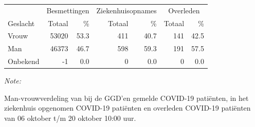 \documentclass[
  english,
  man,floatsintext]{apa6}
\begin{document}
\begin{table}[H]
\centering\begingroup\fontsize{11}{13}\selectfont

\begin{threeparttable}
\begin{tabular}{lrrrrrr}
\toprule
\multicolumn{1}{c}{ } & \multicolumn{2}{c}{Besmettingen} & \multicolumn{2}{c}{Ziekenhuisopnames} & \multicolumn{2}{c}{Overleden} \\
\cmidrule(l{3pt}r{3pt}){2-3} \cmidrule(l{3pt}r{3pt}){4-5} \cmidrule(l{3pt}r{3pt}){6-7}
Geslacht & Totaal & \% & Totaal & \% & Totaal & \%\\
\midrule
Vrouw & 53020 & 53.3 & 411 & 40.7 & 141 & 42.5\\
Man & 46373 & 46.7 & 598 & 59.3 & 191 & 57.5\\
Onbekend & -1 & 0.0 & 0 & 0.0 & 0 & 0.0\\
\bottomrule
\end{tabular}
\begin{tablenotes}
\item \textit{Note: } 
\item Man-vrouwverdeling van bij de GGD’en gemelde COVID-19 patiënten, in het ziekenhuis opgenomen COVID-19 patiënten en overleden COVID-19 patiënten van 06 oktober t/m 20 oktober 10:00 uur.
\end{tablenotes}
\end{threeparttable}
\endgroup{}
\end{table}
\newpage
\end{document}
